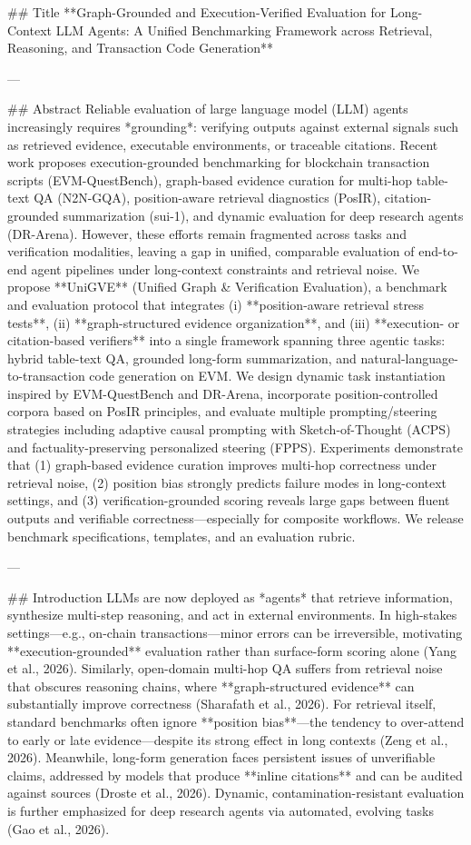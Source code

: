 ## Title  
**Graph-Grounded and Execution-Verified Evaluation for Long-Context LLM Agents: A Unified Benchmarking Framework across Retrieval, Reasoning, and Transaction Code Generation**

---

## Abstract  
Reliable evaluation of large language model (LLM) agents increasingly requires *grounding*: verifying outputs against external signals such as retrieved evidence, executable environments, or traceable citations. Recent work proposes execution-grounded benchmarking for blockchain transaction scripts (EVM-QuestBench), graph-based evidence curation for multi-hop table-text QA (N2N-GQA), position-aware retrieval diagnostics (PosIR), citation-grounded summarization (sui-1), and dynamic evaluation for deep research agents (DR-Arena). However, these efforts remain fragmented across tasks and verification modalities, leaving a gap in unified, comparable evaluation of end-to-end agent pipelines under long-context constraints and retrieval noise.  
We propose **UniGVE** (Unified Graph & Verification Evaluation), a benchmark and evaluation protocol that integrates (i) **position-aware retrieval stress tests**, (ii) **graph-structured evidence organization**, and (iii) **execution- or citation-based verifiers** into a single framework spanning three agentic tasks: hybrid table-text QA, grounded long-form summarization, and natural-language-to-transaction code generation on EVM. We design dynamic task instantiation inspired by EVM-QuestBench and DR-Arena, incorporate position-controlled corpora based on PosIR principles, and evaluate multiple prompting/steering strategies including adaptive causal prompting with Sketch-of-Thought (ACPS) and factuality-preserving personalized steering (FPPS). Experiments demonstrate that (1) graph-based evidence curation improves multi-hop correctness under retrieval noise, (2) position bias strongly predicts failure modes in long-context settings, and (3) verification-grounded scoring reveals large gaps between fluent outputs and verifiable correctness—especially for composite workflows. We release benchmark specifications, templates, and an evaluation rubric.

---

## Introduction  
LLMs are now deployed as *agents* that retrieve information, synthesize multi-step reasoning, and act in external environments. In high-stakes settings—e.g., on-chain transactions—minor errors can be irreversible, motivating **execution-grounded** evaluation rather than surface-form scoring alone (Yang et al., 2026). Similarly, open-domain multi-hop QA suffers from retrieval noise that obscures reasoning chains, where **graph-structured evidence** can substantially improve correctness (Sharafath et al., 2026). For retrieval itself, standard benchmarks often ignore **position bias**—the tendency to over-attend to early or late evidence—despite its strong effect in long contexts (Zeng et al., 2026). Meanwhile, long-form generation faces persistent issues of unverifiable claims, addressed by models that produce **inline citations** and can be audited against sources (Droste et al., 2026). Dynamic, contamination-resistant evaluation is further emphasized for deep research agents via automated, evolving tasks (Gao et al., 2026).

